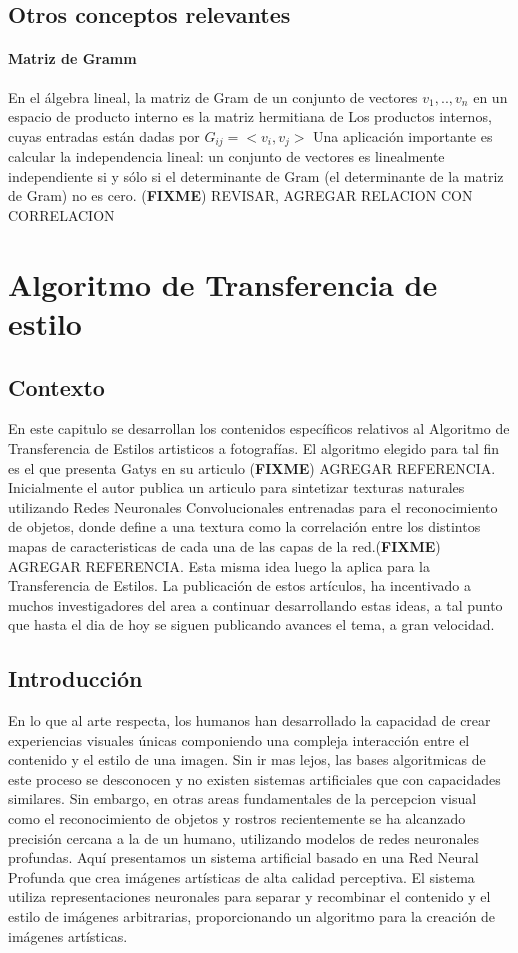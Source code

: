 \documentclass[a4paper,11pt,spanish]{book}
\newcommand*{\FIXME}[1]{{(\textbf{FIXME}) {#1}}}
\begin{document}
     \section {Otros conceptos relevantes}
	\subsubsection{Matriz de Gramm}
	  En el álgebra lineal, la matriz de Gram de un conjunto de vectores $v_{1}, .., v_{n} $ en un espacio de producto interno 
	  es la matriz hermitiana de Los productos internos, cuyas entradas están dadas por $G_{ij} = <v_{i}, v_{j}>$
	  Una aplicación importante es calcular la independencia lineal: un conjunto de vectores es linealmente independiente si y sólo si el determinante de Gram 
	  (el determinante de la matriz de Gram) no es cero.
	  \FIXME{REVISAR, AGREGAR RELACION CON CORRELACION}

\chapter{Algoritmo de Transferencia de estilo}
    \section{Contexto}
      En este capitulo se desarrollan los contenidos específicos relativos al Algoritmo de Transferencia de Estilos artisticos a fotografías. El algoritmo elegido para tal fin es el que 
      presenta Gatys en su articulo \FIXME{AGREGAR REFERENCIA}.
      Inicialmente el autor publica un articulo para sintetizar texturas naturales utilizando Redes Neuronales Convolucionales entrenadas para el reconocimiento de objetos, 
      donde define a una textura como la correlación entre los distintos mapas de caracteristicas de cada una de las capas de la red.\FIXME{AGREGAR REFERENCIA}.
      Esta misma idea luego la aplica para la Transferencia de Estilos.
      La publicación de estos artículos, ha incentivado a muchos investigadores del area a continuar desarrollando estas ideas, a tal punto que hasta el dia de hoy se siguen publicando
      avances el tema, a gran velocidad.

    \section{Introducción} 
      En lo que al arte respecta, los humanos han desarrollado la capacidad de crear experiencias visuales únicas componiendo una compleja interacción entre el contenido y el estilo de una imagen.
      Sin ir mas lejos, las bases algoritmicas de este proceso se desconocen y no existen sistemas artificiales que con capacidades similares. Sin embargo, en otras areas fundamentales
      de la percepcion visual como el reconocimiento de objetos y rostros recientemente se ha alcanzado precisión cercana a la de un humano, utilizando modelos de redes neuronales profundas. 
      Aquí presentamos un sistema artificial basado en una Red Neural Profunda que crea imágenes artísticas de alta calidad perceptiva. El sistema utiliza representaciones neuronales 
      para separar y recombinar el contenido y el estilo de imágenes arbitrarias, proporcionando un algoritmo para la creación de imágenes artísticas.
\end{document}
